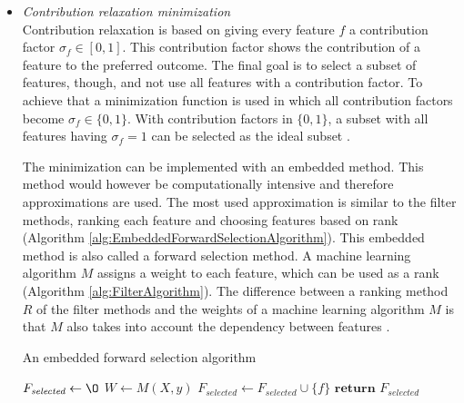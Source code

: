 \documentclass[10pt,a4paper]{report}
\begin{document}
	
	\begin{itemize}
		\item \textit{Contribution relaxation minimization} \\
		
		Contribution relaxation is based on giving every feature $f$ a contribution factor $\sigma_f \in [0, 1]$. This contribution factor shows the contribution of a feature to the preferred outcome. The final goal is to select a subset of features, though, and not use all features with a contribution factor. To achieve that a minimization function is used in which all contribution factors become $\sigma_f \in \{0, 1\}$. With contribution factors in $\{0, 1\}$, a subset with all features having $\sigma_f = 1$ can be selected as the ideal subset \cite{Lal2006}. 
		
		The minimization can be implemented with an embedded method. This method would however be computationally intensive and therefore approximations are used. The most used approximation is similar to the filter methods, ranking each feature and choosing features based on rank (Algorithm \ref{alg:EmbeddedForwardSelectionAlgorithm}). This embedded method is also called a forward selection method. A machine learning algorithm $M$ assigns a weight to each feature, which can be used as a rank (Algorithm \ref{alg:FilterAlgorithm}). The difference between a ranking method $R$ of the filter methods and the weights of a machine learning algorithm $M$ is that $M$ also takes into account the dependency between features \cite{Lal2006}.
		
		\begin{algorithm}[H]
			\caption{An embedded forward selection algorithm \cite{Lal2006}}\label{alg:EmbeddedForwardSelectionAlgorithm}
			\begin{algorithmic}[1]
				\State $F_{\textit{selected}} \gets \O$ 	
				\State $W \gets M(X, y)$					
				 					
							
				\State $F_{\textit{selected}} \gets F_{\textit{selected}} \cup \{f\}$ 
				\EndIf
				\EndFor
				\State $\textbf{return } F_{\textit{selected}}$
				\EndProcedure
			\end{algorithmic}
		\end{algorithm}
	\end{itemize}
	
\end{document}
